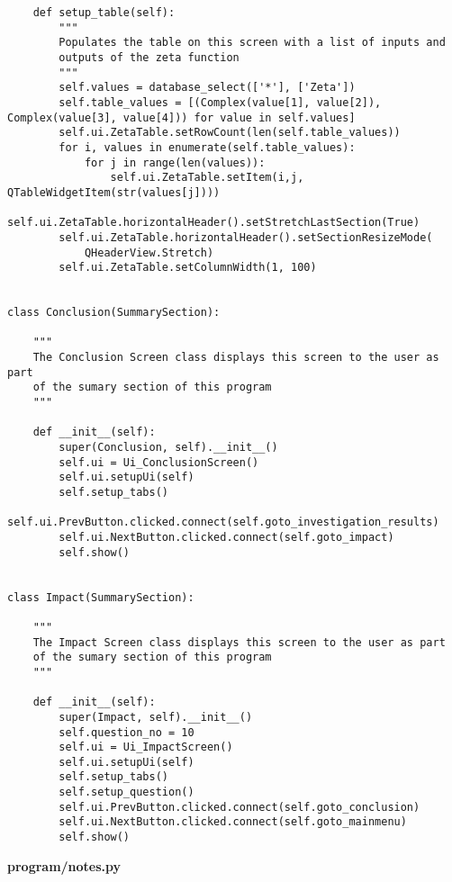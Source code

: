 \documentclass{article}
\begin{document}
\begin{lstlisting}
    def setup_table(self):
        """
        Populates the table on this screen with a list of inputs and
        outputs of the zeta function
        """
        self.values = database_select(['*'], ['Zeta'])
        self.table_values = [(Complex(value[1], value[2]), Complex(value[3], value[4])) for value in self.values]
        self.ui.ZetaTable.setRowCount(len(self.table_values))
        for i, values in enumerate(self.table_values):
            for j in range(len(values)):
                self.ui.ZetaTable.setItem(i,j, QTableWidgetItem(str(values[j])))
        self.ui.ZetaTable.horizontalHeader().setStretchLastSection(True)
        self.ui.ZetaTable.horizontalHeader().setSectionResizeMode(
            QHeaderView.Stretch)
        self.ui.ZetaTable.setColumnWidth(1, 100)


class Conclusion(SummarySection):

    """
    The Conclusion Screen class displays this screen to the user as part
    of the sumary section of this program
    """

    def __init__(self):
        super(Conclusion, self).__init__()
        self.ui = Ui_ConclusionScreen()
        self.ui.setupUi(self)
        self.setup_tabs()
        self.ui.PrevButton.clicked.connect(self.goto_investigation_results)
        self.ui.NextButton.clicked.connect(self.goto_impact)
        self.show()


class Impact(SummarySection):

    """
    The Impact Screen class displays this screen to the user as part
    of the sumary section of this program
    """

    def __init__(self):
        super(Impact, self).__init__()
        self.question_no = 10
        self.ui = Ui_ImpactScreen()
        self.ui.setupUi(self)
        self.setup_tabs()
        self.setup_question()
        self.ui.PrevButton.clicked.connect(self.goto_conclusion)
        self.ui.NextButton.clicked.connect(self.goto_mainmenu)
        self.show()
\end{lstlisting}


\textbf{program/notes.py}
\end{document}
